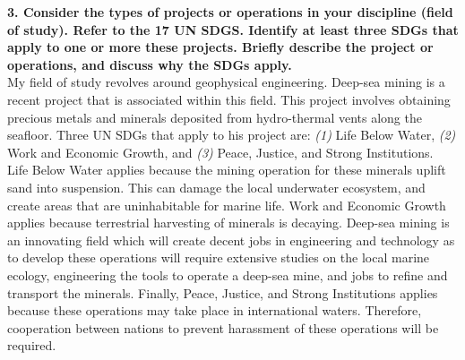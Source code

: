 \documentclass[12pt]{article}
\begin{document}
\textbf{3. Consider the types of projects or operations in your discipline (field of study).  Refer to the 17 UN SDGS.  Identify at least three SDGs that apply to one or more these projects.  Briefly describe the project or operations, and discuss why the SDGs apply.} \\

My field of study revolves around geophysical engineering. Deep-sea mining is a recent project that is associated within this field. This project involves obtaining precious metals and minerals deposited from hydro-thermal vents along the seafloor. Three UN SDGs that apply to his project are: \textit{(1)} Life Below Water, \textit{(2)} Work and Economic Growth, and \textit{(3)} Peace, Justice, and Strong Institutions. \\

Life Below Water applies because the mining operation for these minerals uplift sand into suspension. This can damage the local underwater ecosystem, and create areas that are uninhabitable for marine life. Work and Economic Growth applies because terrestrial harvesting of minerals is decaying. Deep-sea mining is an innovating field which will create decent jobs in engineering and technology as to develop these operations will require extensive studies on the local marine ecology, engineering the tools to operate a deep-sea mine, and jobs to refine and transport the minerals. Finally, Peace, Justice, and Strong Institutions applies because these operations may take place in international waters. Therefore, cooperation between nations to prevent harassment of these operations will be required. 
\end{document}
